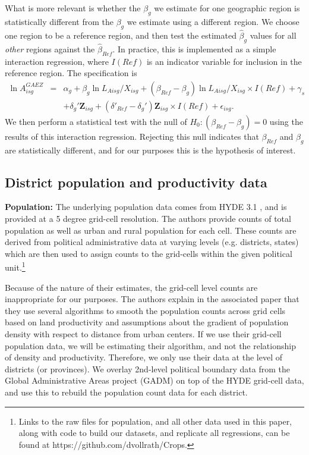 \documentclass[11pt]{article}
\begin{document}
What is more relevant is whether the $\beta_g$ we estimate for one geographic region is statistically different from the $\beta_g$ we estimate using a different region. We choose one region to be a reference region, and then test the estimated $\hat{\beta}_g$ values for all \textit{other} regions against the $\hat{\beta}_{Ref}$. In practice, this is implemented as a simple interaction regression, where $I(Ref)$ is an indicator variable for inclusion in the reference region. The specification is
\begin{eqnarray}
    \ln A^{GAEZ}_{isg} &=& \alpha_g + \beta_g \ln L_{Aisg}/X_{isg} + (\beta_{Ref} - \beta_g) \ln L_{Aisg}/X_{isg} \times I(Ref) + \gamma_{s} \\ \nonumber
     && + \delta_g' \mathbf{Z}_{isg} + (\delta'_{Ref} - \delta_g') \mathbf{Z}_{isg} \times I(Ref) + \epsilon_{isg}. \label{EQ_interaction}
\end{eqnarray}
We then perform a statistical test with the null of $H_0: (\beta_{Ref} - \beta_g) = 0$ using the results of this interaction regression. Rejecting this null indicates that $\beta_{Ref}$ and $\beta_g$ are statistically different, and for our purposes this is the hypothesis of interest.

\subsection{District population and productivity data}

\noindent\textbf{Population:} The underlying population data comes from HYDE 3.1 \citep{hyde31}, and is provided at a 5 degree grid-cell resolution. The authors provide counts of total population as well as urban and rural population for each cell. These counts are derived from political administrative data at varying levels (e.g. districts, states) which are then used to assign counts to the grid-cells within the given political unit.\footnote{Links to the raw files for population, and all other data used in this paper, along with code to build our datasets, and replicate all regressions, can be found at https://github.com/dvollrath/Crops.}

Because of the nature of their estimates, the grid-cell level counts are inappropriate for our purposes. The authors explain in the associated paper that they use several algorithms to smooth the population counts across grid cells based on land productivity and assumptions about the gradient of population density with respect to distance from urban centers. If we use their grid-cell population data, we will be estimating their algorithm, and not the relationship of density and productivity. Therefore, we only use their data at the level of districts (or provinces). We overlay 2nd-level political boundary data from the Global Administrative Areas project (GADM) on top of the HYDE grid-cell data, and use this to rebuild the population count data for each district.
\end{document}
